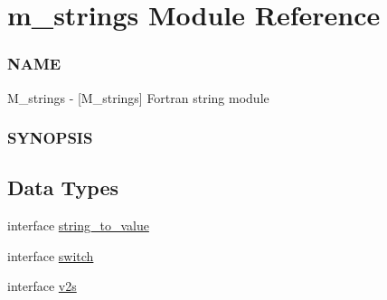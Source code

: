 \hypertarget{namespacem__strings}{}\section{m\+\_\+strings Module Reference}
\label{namespacem__strings}


\subsubsection*{N\+A\+ME}

M\+\_\+strings -\/ \mbox{[}M\+\_\+strings\mbox{]} Fortran string module \subsubsection*{S\+Y\+N\+O\+P\+S\+IS} 


\subsection*{Data Types}
\begin{DoxyCompactItemize}
\item 
interface \hyperlink{interfacem__strings_1_1string__to__value}{string\+\_\+to\+\_\+value}
\item 
interface \hyperlink{interfacem__strings_1_1switch}{switch}
\item 
interface \hyperlink{interfacem__strings_1_1v2s}{v2s}
\end{DoxyCompactItemize}
